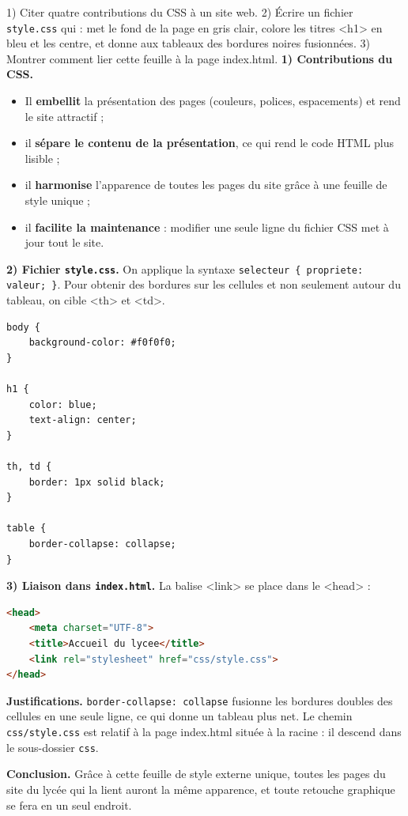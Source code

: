 \documentclass[11pt]{article}
\newcommand{\cle}[1]{{\popxbold\color{popdark}#1}}
\begin{document}
\begin{exoresolu}
1) Citer quatre contributions du CSS à un site web. 2) Écrire un fichier \texttt{style.css} qui : met le fond de la page en gris clair, colore les titres \cle{<h1>} en bleu et les centre, et donne aux tableaux des bordures noires fusionnées. 3) Montrer comment lier cette feuille à la page \cle{index.html}.
\tcblower
\textbf{1) Contributions du CSS.}
\begin{itemize}
\item Il \textbf{embellit} la présentation des pages (couleurs, polices, espacements) et rend le site attractif ;
\item il \textbf{sépare le contenu de la présentation}, ce qui rend le code HTML plus lisible ;
\item il \textbf{harmonise} l'apparence de toutes les pages du site grâce à une feuille de style unique ;
\item il \textbf{facilite la maintenance} : modifier une seule ligne du fichier CSS met à jour tout le site.
\end{itemize}
\textbf{2) Fichier \texttt{style.css}.} On applique la syntaxe \texttt{selecteur \{ propriete: valeur; \}}. Pour obtenir des bordures sur les cellules et non seulement autour du tableau, on cible \cle{<th>} et \cle{<td>}.
\begin{lstlisting}
body {
    background-color: #f0f0f0;
}

h1 {
    color: blue;
    text-align: center;
}

th, td {
    border: 1px solid black;
}

table {
    border-collapse: collapse;
}
\end{lstlisting}
\textbf{3) Liaison dans \texttt{index.html}.} La balise \cle{<link>} se place dans le \cle{<head>} :
\begin{lstlisting}[language=HTML]
<head>
    <meta charset="UTF-8">
    <title>Accueil du lycee</title>
    <link rel="stylesheet" href="css/style.css">
</head>
\end{lstlisting}
\textbf{Justifications.} \texttt{border-collapse: collapse} fusionne les bordures doubles des cellules en une seule ligne, ce qui donne un tableau plus net. Le chemin \texttt{css/style.css} est relatif à la page \cle{index.html} située à la racine : il descend dans le sous-dossier \texttt{css}.

\textbf{Conclusion.} Grâce à cette feuille de style externe unique, toutes les pages du site du lycée qui la lient auront la même apparence, et toute retouche graphique se fera en un seul endroit.
\end{exoresolu}
\end{document}

